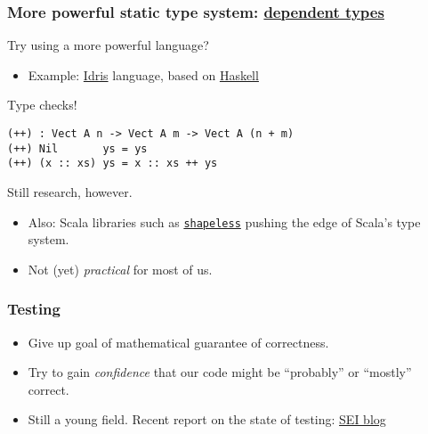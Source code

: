 \documentclass{beamer}
\begin{document}
\begin{frame}[fragile]
  \frametitle{More powerful static type system: \href{http://en.wikipedia.org/wiki/Dependent\_type}{dependent types}}

  \begin{block}{Try using a more powerful language?}
    \begin{itemize}
      \item Example: \href{http://idris-lang.org/}{Idris} language, based on \href{http://haskell.org/}{Haskell}
    \end{itemize}
  \end{block}

  \begin{block}{Type checks!}
    \begin{verbatim}
(++) : Vect A n -> Vect A m -> Vect A (n + m)
(++) Nil       ys = ys
(++) (x :: xs) ys = x :: xs ++ ys
    \end{verbatim}
  \end{block}

  \begin{block}{Still research, however.}
    \begin{itemize}
      \item Also: Scala libraries such as \href{https://github.com/milessabin/shapeless}{\texttt{shapeless}} pushing the edge of Scala's type system.
      \item Not (yet) \emph{practical} for most of us.
    \end{itemize}
  \end{block}
\end{frame}

\begin{frame}
  \frametitle{Testing}


  \begin{itemize}
    \item<2-> Give up goal of mathematical guarantee of correctness.
    \item<3-> Try to gain \emph{confidence} that our code might be ``probably'' or ``mostly'' correct.
    \item<4-> Still a young field. Recent report on the state of testing: \href{http://blog.sei.cmu.edu/post.cfm/common-testing-problems-pitfalls-to-prevent-and-mitigate}{SEI blog}
  \end{itemize}

\end{frame}
\end{document}
